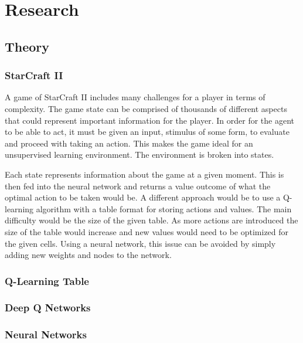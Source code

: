 \chapter{Research}%
\label{research}

\section{Theory}

\subsection{StarCraft II}

A game of StarCraft II includes many challenges for a player in terms of complexity.
The game state can be comprised of thousands of different aspects that could represent
important information for the player. In order for the agent to be able to act,
it must be given an input, stimulus of some form, to evaluate and proceed with
taking an action. This makes the game ideal for an unsupervised learning environment.
The environment is broken into states.

Each state represents information about the game at a given moment.
This is then fed into the neural network and returns a value outcome of what the
optimal action to be taken would be.
A different approach would be to use a Q-learning algorithm with a table format for
storing actions and values.
The main difficulty would be the size of the given table.
As more actions are introduced the size of the table would increase and new values would
need to be optimized for the given cells.
Using a neural network, this issue can be avoided by simply adding new weights and
nodes to the network.

\subsection{Q-Learning Table}

\subsection{Deep Q Networks}

\subsection{Neural Networks}

